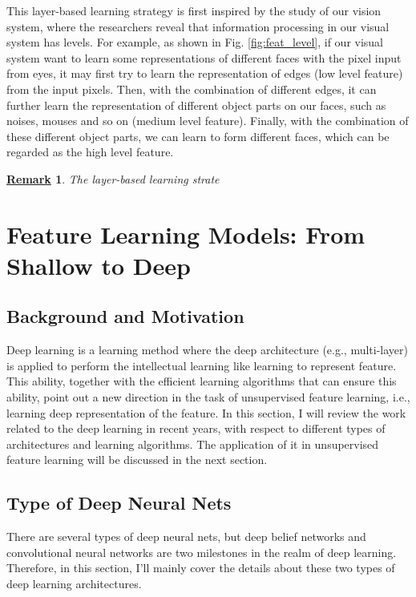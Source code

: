 \documentclass[conference]{IEEEtran}
\newtheorem{remark}{\underline{Remark}}
\begin{document}
This layer-based learning strategy is first inspired by the study of our vision system, where the researchers reveal that information processing in our visual system has levels. For example, as shown in Fig. \ref{fig:feat_level}, if our visual system want to learn some representations of different faces with the pixel input from eyes, it may first try to learn the representation of edges (low level feature) from the input pixels. Then, with the combination of different edges, it can further learn the representation of different object parts on our faces, such as noises, mouses and so on (medium level feature). Finally, with the combination of these different object parts, we can learn to form different faces, which can be regarded as the high level feature.

\begin{remark}
The layer-based learning strate
\end{remark}

\section{Feature Learning Models: From Shallow to Deep}

\subsection{Background and Motivation}

Deep learning is a learning method where the deep architecture (e.g., multi-layer) is applied to perform the intellectual learning like learning to represent feature. This ability, together with the efficient learning algorithms that can ensure this ability, point out a new direction in the task of unsupervised feature learning, i.e., learning deep representation of the feature. In this section, I will review the work related to the deep learning in recent years, with respect to different types of architectures and learning algorithms. The application of it in unsupervised feature learning will be discussed in the next section.


\subsection{Type of Deep Neural Nets}

There are several types of deep neural nets, but deep belief networks and convolutional neural networks are two milestones in the realm of deep learning. Therefore, in this section, I'll mainly cover the details about these two types of deep learning architectures.
\end{document}
